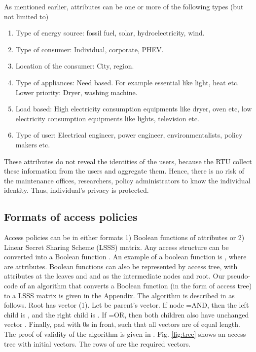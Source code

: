 \documentclass[conference]{IEEEtran}[10pt]
\begin{document}
As mentioned earlier, attributes can be one or more of the following types (but not limited to)
\begin{enumerate}
\item Type of energy source: fossil fuel, solar, hydroelectricity, wind.
\item Type of consumer: Individual, corporate, PHEV.
\item Location of the consumer: City, region. 
\item Type of appliances: Need based. For example essential like light, heat etc. Lower priority: Dryer,  washing machine.
\item Load based: High electricity consumption equipments like dryer, oven etc, low electricity consumption equipments like lights, television etc.
\item Type of user: Electrical engineer, power engineer, environmentalists, policy makers etc.  
\end{enumerate}

These attributes do not reveal the identities of the users, because the RTU collect these information from the users and aggregate them. 
Hence, there is no risk of the maintenance offices, researchers, policy administrators to know the individual identity. 
Thus, individual's privacy is protected. 
 


\subsection{Formats of access policies}
\label{subsec:access policy}
Access policies can be in either formats 1) Boolean functions of attributes or 2) Linear Secret Sharing Scheme (LSSS) matrix. 
Any access structure can be converted into a Boolean function \cite{LW11}. 
An example of a boolean function is , 
where  are attributes. 
Boolean functions can also be represented by access tree, with attributes at the leaves and  and   
as the intermediate nodes and root. 
Our pseudo-code of an algorithm that converts a Boolean function (in the form of access tree) to a LSSS  matrix is given in the Appendix. 
The algorithm is described in \cite{LW11} as follows. Root has vector (1). Let  be parent's vector. 
If node =AND, then the left child is , and the right child is .
If =OR, then both children also have unchanged vector .
Finally, pad with 0s in front, such that all vectors are of equal length.
The proof of validity of the algorithm is given in \cite{B96}. 
Fig. \ref{fig:tree} shows an access tree with initial vectors.  The rows of  are the required vectors.
\end{document}
